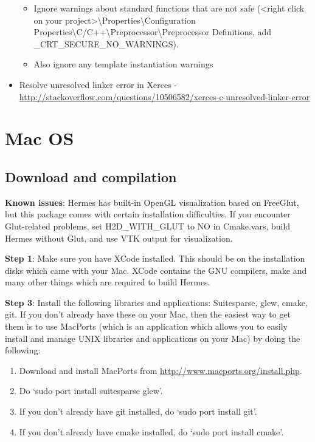 \documentclass[a4paper,0pt,english]{sphinxmanual}
\begin{document}
\begin{itemize}
\begin{itemize}
\item {} 
Ignore warnings about standard functions that are not safe (\textless{}right click on your project\textgreater{}\textbackslash{}Properties\textbackslash{}Configuration Properties\textbackslash{}C/C++\textbackslash{}Preprocessor\textbackslash{}Preprocessor Definitions, add \_CRT\_SECURE\_NO\_WARNINGS).

\item {} 
Also ignore any template instantiation warnings

\end{itemize}

\item {} 
Resolve unresolved linker error in Xerces
- \href{http://stackoverflow.com/questions/10506582/xerces-c-unresolved-linker-error}{http://stackoverflow.com/questions/10506582/xerces-c-unresolved-linker-error}

\end{itemize}


\section{Mac OS}
\label{src/installation/mac:mac-os}\label{src/installation/mac::doc}

\subsection{Download and compilation}
\label{src/installation/mac:download-and-compilation}
\textbf{Known issues}: Hermes has built-in OpenGL visualization based on FreeGlut, but this package
comes with certain installation difficulties. If you encounter Glut-related problems, set
H2D\_WITH\_GLUT to NO in Cmake.vars, build Hermes without Glut, and use VTK output for visualization.

\textbf{Step 1}: Make sure you have XCode installed. This should be on the installation
disks which came with your Mac. XCode contains the GNU compilers, make
and many other things which are required to build Hermes.

\textbf{Step 3}: Install the following libraries and applications: Suitesparse,
glew, cmake, git. If you don't already have these on your Mac, then
the easiest way to get them is to use MacPorts (which is an
application which allows you to easily install and manage UNIX
libraries and applications on your Mac) by doing the following:
\begin{enumerate}
\item {} 
Download and install MacPorts from
\href{http://www.macports.org/install.php}{http://www.macports.org/install.php}.

\item {} 
Do `sudo port install suitesparse glew'.

\item {} 
If you don't already have git installed, do
`sudo port install git'.

\item {} 
If you don't already have cmake installed, do
`sudo port install cmake'.

\end{enumerate}
\end{document}
